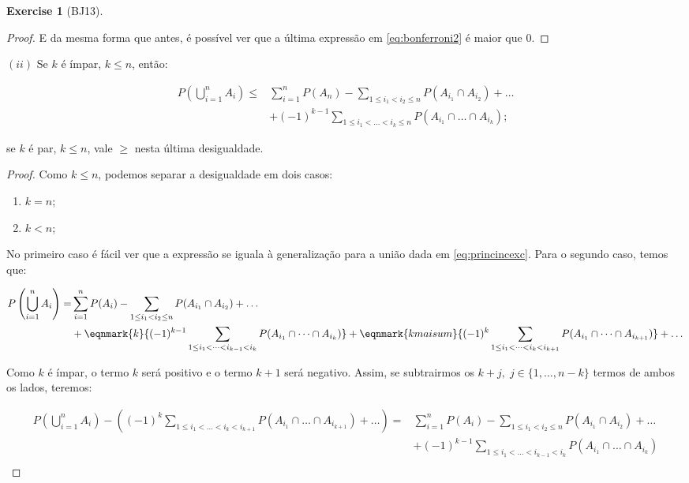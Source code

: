 \documentclass[
]{article}
\providecommand{\tightlist}{%
  \setlength{\itemsep}{0pt}\setlength{\parskip}{0pt}}
\theoremstyle{definition}
\theoremstyle{definition}
\theoremstyle{definition}
\newtheorem{exercise}{Exercise}[section]
\theoremstyle{definition}
\theoremstyle{remark}
\begin{document}
\begin{exercise}[BJ13]
\begin{proof}
E da mesma forma que antes, é possível ver que a última expressão em \eqref{eq:bonferroni2} é maior que 0.
\end{proof}

\((ii)\) Se \(k\) é ímpar, \(k \le n\), então:

\begin{align*}
P\left(\bigcup_{i=1}^{n} A_{i}\right) \le &\sum_{i=1}^{n}P(A_{n}) - \sum_{1 \le i_{1} < i_{2} \le n}P(A_{i_{1}} \cap A_{i_{2}}) + \dots \\
&+ (-1)^{k-1} \sum_{1 \le i_{1} < \dots < i_{k} \le n}P(A_{i_{1}} \cap \dots \cap A_{i_{k}});
\end{align*}

se \(k\) é par, \(k \le n\), vale \(\ge\) nesta última desigualdade.

\begin{proof}
Como \(k \le n\), podemos separar a desigualdade em dois casos:

\begin{enumerate}
\def\labelenumi{\arabic{enumi}.}
\tightlist
\item
  \(k = n\);
\item
  \(k < n\);
\end{enumerate}

No primeiro caso é fácil ver que a expressão se iguala à generalização para a união dada em \eqref{eq:princincexc}. Para o segundo caso, temos que:

\begin{align*}
P\left(\bigcup_{i=1}^{n} A_{i}\right) = &\sum_{i=1}^{n}P(A_{i}) - \sum_{1 \le i_{1} < i_{2} \le n}P(A_{i_{1}} \cap A_{i_{2}}) + \dots \\
&+ \eqnmark{k}{(-1)^{k-1} \sum_{1 \le i_{1} < \dots < i_{k-1} < i_{k}}P(A_{i_{1}} \cap \dots \cap A_{i_{k}})} + \eqnmark{kmaisum}{(-1)^{k} \sum_{1 \le i_{1} < \dots < i_{k} < i_{k+1}}P(A_{i_{1}} \cap \dots \cap A_{i_{k+1}})} + \dots \\
\end{align*}

Como \(k\) é ímpar, o termo \(k\) será positivo e o termo \(k+1\) será negativo. Assim, se subtrairmos os \(k+j,\; j \in\{1,\dots,n-k\}\) termos de ambos os lados, teremos:

\begin{equation*}
\begin{split}
P\left(\bigcup_{i=1}^{n} A_{i}\right) - \left((-1)^{k} \sum_{1 \le i_{1} < \dots < i_{k} < i_{k+1}}P(A_{i_{1}} \cap \dots \cap A_{i_{k+1}}) + \dots \right) = &\sum_{i=1}^{n}P(A_{i}) - \sum_{1 \le i_{1} < i_{2} \le n}P(A_{i_{1}} \cap A_{i_{2}}) + \dots \\
&+ (-1)^{k-1} \sum_{1 \le i_{1} < \dots < i_{k-1} < i_{k}}P(A_{i_{1}} \cap \dots \cap A_{i_{k}}) \\
\end{split}
\end{equation*}


\end{proof}
\end{exercise}
\end{document}
